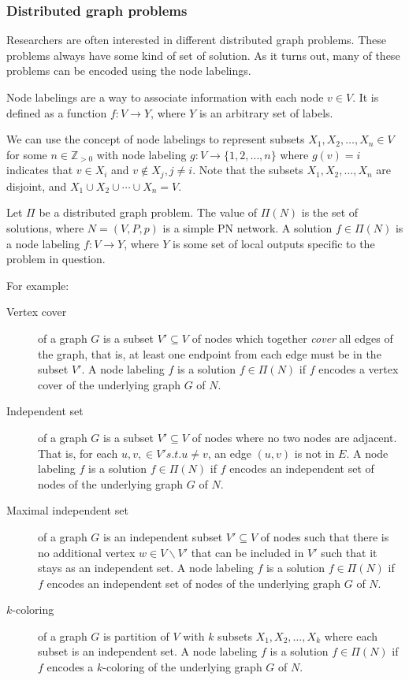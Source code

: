 \subsubsection{Distributed graph problems}
Researchers are often interested in different distributed graph problems.
These problems always have some kind of set of solution.
As it turns out, many of these problems can be encoded using the node labelings.

Node labelings are a way to associate information with each node $v \in V$.
It is defined as a function $f\colon V \rightarrow Y$, where $Y$ is an arbitrary set of labels.

We can use the concept of node labelings to represent subsets $X_1, X_2, \dotsc, X_n \in V$ for some $n \in \mathbb{Z}_{>0}$ with node labeling $g\colon V \rightarrow \{1, 2, \dotsc, n\}$ where $g(v) = i$ indicates that $v \in X_i$ and $v \notin X_j, j \neq i$.
Note that the subsets $X_1, X_2, \dotsc, X_n$  are disjoint, and $X_1 \cup X_2 \cup \dotsb \cup X_n = V$.

Let $\Pi$ be a distributed graph problem.
The value of $\Pi(N)$ is the set of solutions, where $N=(V, P, p)$ is a simple PN network.
A solution $f \in \Pi(N)$ is a node labeling $f\colon V \rightarrow Y$, where $Y$ is some set of local outputs specific to the problem in question.

For example:
\begin{description}
  \item[Vertex cover] of a graph $G$ is a subset $V' \subseteq V$ of nodes which together \emph{cover} all edges of the graph, that is, at least one endpoint from each edge must be in the subset $V'$.
  A node labeling $f$ is a solution $f \in \Pi(N)$ if $f$ encodes a vertex cover of the underlying graph $G$ of $N$.
  \item[Independent set] of a graph $G$ is a subset $V' \subseteq V$ of nodes where no two nodes are adjacent. That is, for each $u, v, \in V' s.t. u \neq v$, an edge $(u, v)$ is not in $E$.
  A node labeling $f$ is a solution $f \in \Pi(N)$ if $f$ encodes an independent set of nodes of the underlying graph $G$ of $N$.
  \item[Maximal independent set] of a graph $G$ is an independent subset $V' \subseteq V$ of nodes such that there is no additional vertex $w \in V \backslash V'$ that can be included in $V'$ such that it stays as an independent set.
  A node labeling $f$ is a solution $f \in \Pi(N)$ if $f$ encodes an independent set of nodes of the underlying graph $G$ of $N$.
  \item[$k$-coloring] of a graph $G$ is partition of $V$ with $k$ subsets $X_1, X_2, \dotsc, X_k$ where each subset is an independent set.
  A node labeling $f$ is a solution $f \in \Pi(N)$ if $f$ encodes a $k$-coloring of the underlying graph $G$ of $N$.
\end{description}

